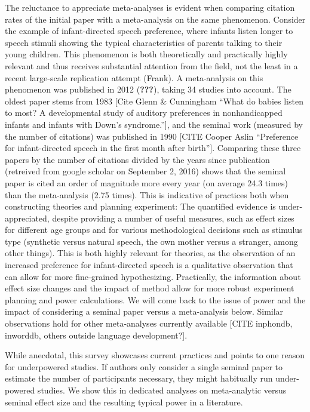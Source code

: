 \documentclass[english,floatsintext,man]{apa6}
\newcounter{author}
\begin{document}
The reluctance to appreciate meta-analyses is evident when comparing
citation rates of the initial paper with a meta-analysis on the same
phenomenon. Consider the example of infant-directed speech preference,
where infants listen longer to speech stimuli showing the typical
characteristics of parents talking to their young children. This
phenomenon is both theoretically and practically highly relevant and
thus receives substantial attention from the field, not the least in a
recent large-scale replication attempt (Frank). A meta-analysis on this
phenomenon was published in 2012 ({\textbf{???}}), taking 34 studies
into account. The oldest paper stems from 1983 {[}Cite Glenn \&
Cunningham \enquote{What do babies listen to most? A developmental study
of auditory preferences in nonhandicapped infants and infants with
Down's syndrome.}{]}, and the seminal work (measured by the number of
citations) was published in 1990 {[}CITE Cooper Aslin
\enquote{Preference for infant-directed speech in the first month after
birth}{]}. Comparing these three papers by the number of citations
divided by the years since publication (retreived from google scholar on
September 2, 2016) shows that the seminal paper is cited an order of
magnitude more every year (on average 24.3 times) than the meta-analysis
(2.75 times). This is indicative of practices both when constructing
theories and planning experiment: The quantified evidence is
under-appreciated, despite providing a number of useful measures, such
as effect sizes for different age groups and for various methodological
decisions such as stimulus type (synthetic versus natural speech, the
own mother versus a stranger, among other things). This is both highly
relevant for theories, as the observation of an increased preference for
infant-directed speech is a qualitative observation that can allow for
more fine-grained hypothesizing. Practically, the information about
effect size changes and the impact of method allow for more robust
experiment planning and power calculations. We will come back to the
issue of power and the impact of considering a seminal paper versus a
meta-analysis below. Similar observations hold for other meta-analyses
currently available {[}CITE inphondb, inworddb, others outside language
development?{]}.

While anecdotal, this survey showcases current practices and points to
one reason for underpowered studies. If authors only consider a single
seminal paper to estimate the number of participants necessary, they
might habitually run under-powered studies. We show this in dedicated
analyses on meta-analytic versus seminal effect size and the resulting
typical power in a literature.
\end{document}
